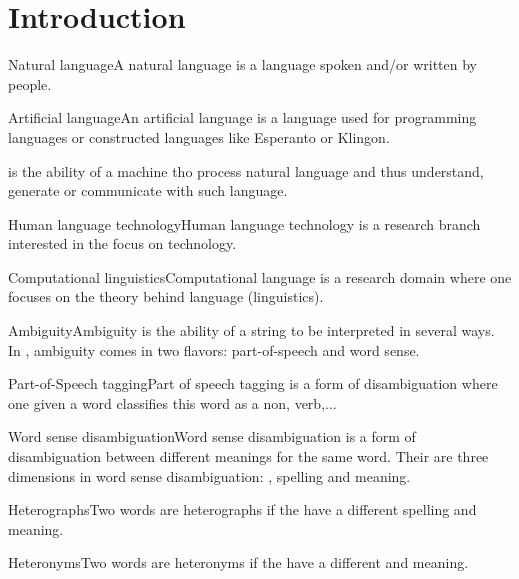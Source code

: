 \documentclass{article}
\title{\nlp{}}
\author{Willem Van Onsem}
\date{june 2013}
\begin{document}
\maketitle
\tableofcontents
\section{Introduction}
\begin{df}{Natural language}A natural language is a language spoken and/or written by people.
\end{df}
\begin{df}{Artificial language}An artificial language is a language used for programming languages or constructed languages like Esperanto or Klingon.
\end{df}
\begin{df}{\nlp{}}\nlp{} is the ability of a machine tho process natural language and thus understand, generate or communicate with such language.
\end{df}
\begin{df}{Human language technology}Human language technology is a research branch interested in the focus on technology.
\end{df}
\begin{df}{Computational linguistics}Computational language is a research domain where one focuses on the theory behind language (linguistics).
\end{df}
\begin{df}{Ambiguity}Ambiguity is the ability of a string to be interpreted in several ways. In \nlp{}, ambiguity comes in two flavors: part-of-speech and word sense.
\end{df}
\begin{df}{Part-of-Speech tagging}Part of speech tagging is a form of disambiguation where one given a word classifies this word as a non, verb,...
\end{df}
\begin{df}{Word sense disambiguation}Word sense disambiguation is a form of disambiguation between different meanings for the same word. Their are three dimensions in word sense disambiguation: \pnc{}, spelling and meaning.
\end{df}
\begin{df}{Heterographs}Two words are heterographs if the have a different spelling and meaning.
\end{df}
\begin{df}{Heteronyms}Two words are heteronyms if the have a different \pnc{} and meaning.
\end{df}
\end{document}
